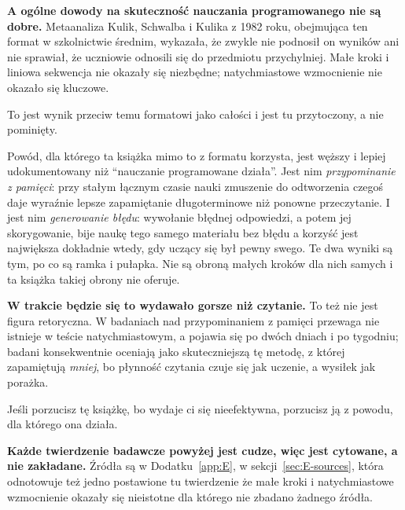 \begin{warning}
\textbf{A ogólne dowody na skuteczność nauczania programowanego nie są dobre.}
Metaanaliza Kulik, Schwalba i Kulika z 1982 roku, obejmująca ten format w
szkolnictwie średnim, wykazała, że zwykle nie podnosił on wyników ani nie
sprawiał, że uczniowie odnosili się do przedmiotu przychylniej. Małe kroki i
liniowa sekwencja nie okazały się niezbędne; natychmiastowe wzmocnienie nie
okazało się kluczowe.

To jest wynik przeciw temu formatowi jako całości i jest tu przytoczony, a nie
pominięty.

Powód, dla którego ta książka mimo to z formatu korzysta, jest węższy i lepiej
udokumentowany niż \enquote{nauczanie programowane działa}. Jest nim
\emph{przypominanie z pamięci}: przy stałym łącznym czasie nauki zmuszenie do
odtworzenia czegoś daje wyraźnie lepsze zapamiętanie długoterminowe niż
ponowne przeczytanie. I jest nim \emph{generowanie błędu}: wywołanie błędnej
odpowiedzi, a potem jej skorygowanie, bije naukę tego samego materiału bez
błędu \dash{} a korzyść jest największa dokładnie wtedy, gdy uczący się był
pewny swego. Te dwa wyniki są tym, po co są ramka i pułapka. Nie są obroną
małych kroków dla nich samych i ta książka takiej obrony nie oferuje.
\end{warning}

\begin{warning}
\textbf{W trakcie będzie się to wydawało gorsze niż czytanie.} To też nie jest
figura retoryczna. W badaniach nad przypominaniem z pamięci przewaga nie
istnieje w teście natychmiastowym, a pojawia się po dwóch dniach i po tygodniu;
badani konsekwentnie oceniają jako skuteczniejszą tę metodę, z której zapamiętują
\emph{mniej}, bo płynność czytania czuje się jak uczenie, a wysiłek jak porażka.

Jeśli porzucisz tę książkę, bo wydaje ci się nieefektywna, porzucisz ją z
powodu, dla którego ona działa.

\medskip
\textbf{Każde twierdzenie badawcze powyżej jest cudze, więc jest cytowane, a
nie zakładane.} Źródła są w Dodatku~\ref{app:E}, w
sekcji~\ref{sec:E-sources}, która odnotowuje też jedno postawione tu
twierdzenie \dash{} że małe kroki i natychmiastowe wzmocnienie okazały się
nieistotne \dash{} dla którego nie zbadano żadnego źródła.
\end{warning}
